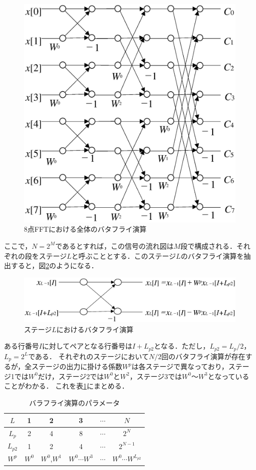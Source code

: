 \begin{figure}[H]
\begin{center}
\includegraphics[width=.6\textwidth]{fig/butterfly7.eps}
\end{center}
\caption{8点FFTにおける全体のバタフライ演算}
\label{fig:butterfly8}
\end{figure}

ここで，$N=2^M$であるとすれば，この信号の流れ図は$M$段で構成される．それぞれの段をステージ$L$と呼ぶこととする．このステージ$L$のバタフライ演算を抽出すると，図\ref{fig:butterfly9}のようになる．



\begin{figure}[H]
\begin{center}
\includegraphics[width=.6\textwidth]{fig/butterfly8.eps}
\end{center}
\caption{ステージ$L$におけるバタフライ演算}
\label{fig:butterfly9}
\end{figure}

ある行番号$I$に対してペアとなる行番号は$I+L_{p2}$となる．ただし，$L_{p2}=L_p/2$，$L_p=2^L$である．
%
それぞれのステージにおいて$N/2$回のバタフライ演算が存在するが，全ステージの出力に掛ける係数$W^p$は各ステージで異なっており，ステージ1では$W^0$だけ，ステージ2では$W^0$と$W^2$，ステージ3では$W^0$～$W^3$となっていることがわかる．
これを表\ref{table:batterfly-p}にまとめる．

\begin{table}[ht]
\caption{バラフライ演算のパラメータ}
\label{table:batterfly-p}
\begin{center}
\begin{tabular}{c|c|c|c|c|c}
\hline
$L$ & 1 & 2 & 3 & $\cdots$ & $N$ \\ \hline
$L_p$ & 2 & 4 & 8 & $\cdots$ & $2^N$ \\ \hline
$L_{p2}$ & 1 & 2 & 4 & $\cdots$ & $2^{N-1}$ \\ \hline
$W^p$ & $W^0$ & $W^0$,$W^1$ & $W^0 \cdots W^3$ & $\cdots$ & $W^0 \cdots W^{L_{p2}}$ \\ \hline
\end{tabular}
\end{center}
\end{table}

